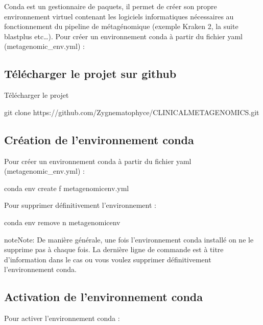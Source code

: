 \documentclass[letterpaper,10pt,french]{sphinxmanual}
\begin{document}
Conda est un gestionnaire de paquets, il permet de créer son propre environnement virtuel contenant les logiciels informatiques nécessaires au fonctionnement du pipeline de métagénomique (exemple Kraken 2, la suite blast\sphinxhyphen{}plus etc…). Pour créer un environnement conda à partir du fichier yaml (metagenomic\_env.yml) :


\subsection{Télécharger le projet sur github}
\label{\detokenize{installation_conda_environnement:telecharger-le-projet-sur-github}}
Télécharger le projet

\begin{sphinxVerbatim}[commandchars=\\\{\}]
git clone https://github.com/Zygnematophyce/CLINICAL\PYGZus{}METAGENOMICS.git
\end{sphinxVerbatim}


\subsection{Création de l’environnement conda}
\label{\detokenize{installation_conda_environnement:creation-de-l-environnement-conda}}
Pour créer un environnement conda à partir du fichier yaml (metagenomic\_env.yml) :

\begin{sphinxVerbatim}[commandchars=\\\{\}]
conda env create \PYGZhy{}f metagenomic\PYGZus{}env.yml
\end{sphinxVerbatim}

Pour supprimer définitivement l’environnement :

\begin{sphinxVerbatim}[commandchars=\\\{\}]
conda env remove \PYGZhy{}n metagenomic\PYGZus{}env
\end{sphinxVerbatim}

\begin{sphinxadmonition}{note}{Note:}
De manière générale, une fois l’environnement conda installé on ne le supprime pas à chaque fois. La dernière ligne de commande est à titre d’information dans le cas ou vous voulez supprimer définitivement l’environnement conda.
\end{sphinxadmonition}


\subsection{Activation de l’environnement conda}
\label{\detokenize{installation_conda_environnement:activation-de-l-environnement-conda}}
Pour activer l’environnement conda :
\end{document}
